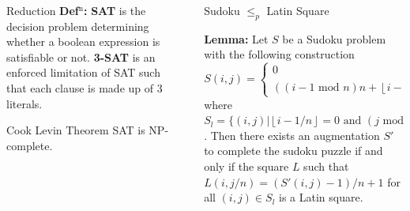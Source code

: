 \documentclass[final]{beamer}
\newlength{\sepwidth}
\newlength{\colwidth}
\newcounter{row}
\newcounter{col}
\newcommand{\separatorcolumn}{\begin{column}{\sepwidth}\end{column}}
\newcommand\setrow[9]{
  \setcounter{col}{1}
  \foreach \n in {#1, #2, #3, #4, #5, #6, #7, #8, #9} {
    \edef\x{\value{col} - 0.5}
    \edef\y{9.5 - \value{row}}
    \node[anchor=center] at (\x, \y) {\n};
    \stepcounter{col}
  }
  \stepcounter{row}
}
\begin{document}
\begin{frame}[t]
\begin{columns}[t]
\begin{column}{\colwidth}
\begin{block}{Reduction}
\textbf{Def$^\text{n}$:}  \textbf{SAT} is the decision problem determining whether a boolean expression is satisfiable or not. \textbf{3-SAT} is an enforced limitation of SAT such that each clause is made up of 3 literals. 


  \end{block}
  \begin{alertblock}{Cook Levin Theorem}
SAT is NP-complete.
  \end{alertblock}
\end{column}

\separatorcolumn

\begin{column}{\colwidth}
  \begin{block}{Sudoku $\leq_p$ Latin Square}

\textbf{Lemma:} Let $S$ be a Sudoku problem with the following construction 
\begin{equation}
	S(i,j) =\begin{cases}
0 \qquad\qquad\qquad\qquad\qquad\qquad\text{when } (i,j) \in S_l \\ 
((i-1 \text{ mod } n)n + \left\lfloor{i-1/n}\right\rfloor+j-1)\text{ mod } n^2 +1 \quad\text{otherwise}
\end{cases}
\end{equation}
where $S_l=\{(i,j)| \left\lfloor{i-1/n}\right\rfloor=0 \text{ and }(j \text{ mod }n)=1\}$. Then there exists an augmentation $S'$ to complete the sudoku puzzle if and only if the square $L$ such that $L(i,j/n)=(S'(i,j)-1)/n+1$ for all $(i,j) \in S_l$ is a Latin square.

\end{block}
\end{column}
\end{columns}
\end{frame}
\end{document}
